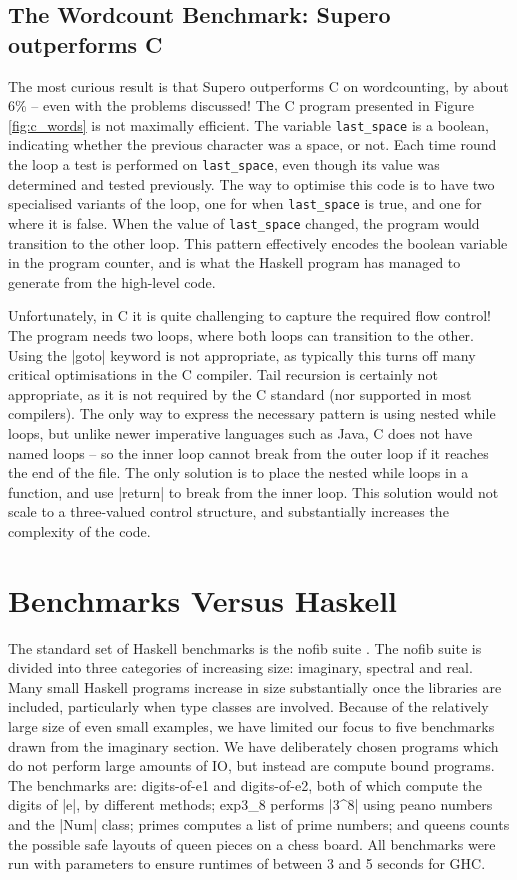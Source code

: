 \documentclass{llncs}
\begin{document}
\subsection{The Wordcount Benchmark: Supero outperforms C}

The most curious result is that Supero outperforms C on wordcounting, by about 6\% -- even with the problems discussed! The C program presented in Figure \ref{fig:c_words} is not maximally efficient. The variable \verb"last_space" is a boolean, indicating whether the previous character was a space, or not. Each time round the loop a test is performed on \verb"last_space", even though its value was determined and tested previously. The way to optimise this code is to have two specialised variants of the loop, one for when \verb"last_space" is true, and one for where it is false. When the value of \verb"last_space" changed, the program would transition to the other loop. This pattern effectively encodes the boolean variable in the program counter, and is what the Haskell program has managed to generate from the high-level code.

Unfortunately, in C it is quite challenging to capture the required flow control! The program needs two loops, where both loops can transition to the other. Using the |goto| keyword is not appropriate, as typically this turns off many critical optimisations in the C compiler. Tail recursion is certainly not appropriate, as it is not required by the C standard (nor supported in most compilers). The only way to express the necessary pattern is using nested while loops, but unlike newer imperative languages such as Java, C does not have named loops -- so the inner loop cannot break from the outer loop if it reaches the end of the file. The only solution is to place the nested while loops in a function, and use |return| to break from the inner loop. This solution would not scale to a three-valued control structure, and substantially increases the complexity of the code.

\section{Benchmarks Versus Haskell}

The standard set of Haskell benchmarks is the nofib suite \cite{nofib}. The nofib suite is divided into three categories of increasing size: imaginary, spectral and real. Many small Haskell programs increase in size substantially once the libraries are included, particularly when type classes are involved. Because of the relatively large size of even small examples, we have limited our focus to five benchmarks drawn from the imaginary section. We have deliberately chosen programs which do not perform large amounts of IO, but instead are compute bound programs. 
The benchmarks are: digits-of-e1 and digits-of-e2, both of which compute the digits of |e|, by different methods; exp3\_8 performs |3^8| using peano numbers and the |Num| class; primes computes a list of prime numbers; and queens counts the possible safe layouts of queen pieces on a chess board. All benchmarks were run with parameters to ensure runtimes of between 3 and 5 seconds for GHC.
\end{document}
